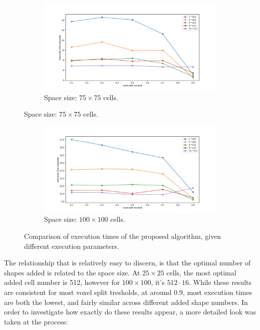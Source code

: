 \documentclass[12pt, oneside]{report}
\begin{document}
\begin{figure}[H]\ContinuedFloat

\begin{subfigure}[b]{\linewidth}
  \centering
	\includegraphics[width=\linewidth,keepaspectratio]{Images/SummaryOptimisation/results_75.pdf}
	\caption{Space size: $75 \times 75$ cells. }
	\label{summary_res75}
\end{subfigure}

\end{figure}
\begin{figure}[H]\ContinuedFloat

\begin{subfigure}[b]{\linewidth}
  \centering
	\includegraphics[width=\linewidth,keepaspectratio]{Images/SummaryOptimisation/results_100.pdf}
	\caption{Space size: $100 \times 100$ cells.}
	\label{summary_res100}
\end{subfigure}

\caption{Comparison of execution times of the proposed algorithm, given different execution parameters.}

\end{figure}

The relationship that is relatively easy to discern, is that the optimal number of shapes added is related to the space size. At $25 \times 25$ cells, the most optimal added cell number is 512, however for $100 \times 100$, it's $512 \cdot 16$. While these results are consistent for most voxel split tresholds, at around 0.9, most execution times are both the lowest, and fairly similar across different added shape numbers. In order to investigate how exactly do these results appear, a more detailed look was taken at the process:
\end{document}
